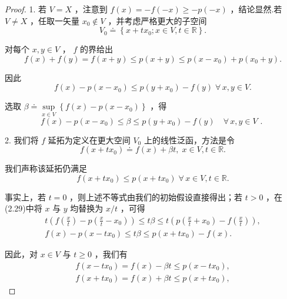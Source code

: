 \begin{proof}
1. 若 $V = X$ ，注意到 $f\left( x\right)  =  - f\left( {-x}\right)  \geq   - p\left( {-x}\right)$ ，结论显然.若 $V \neq  X$ ，任取一矢量 ${x}_{0} \notin  V$ ，并考虑严格更大的子空间
\[
{V}_{0} \doteq  \left\{  {x + t{x}_{0};x \in  V,t \in  \mathbb{R}}\right\}  .
\]

对每个 $x,y \in  V$ ， $f$ 的界给出
\[
f\left( x\right)  + f\left( y\right)  = f\left( {x + y}\right)  \leq  p\left( {x + y}\right)  \leq  p\left( {x - {x}_{0}}\right)  + p\left( {{x}_{0} + y}\right) .
\]

因此
\[
f\left( x\right)  - p\left( {x - {x}_{0}}\right)  \leq  p\left( {y + {x}_{0}}\right)  - f\left( y\right) \;\forall\,x,y \in  V.
\]

选取 $\beta  \doteq  \mathop{\sup }\limits_{{x \in  V}}\left\{  {f\left( x\right)  - p\left( {x - {x}_{0}}\right) }\right\}$ ，得
\begin{equation}\tag{2.29}
f\left( x\right)  - p\left( {x - {x}_{0}}\right)  \leq  \beta  \leq  p\left( {y + {x}_{0}}\right)  - f\left( y\right) \quad \forall\,x,y \in  V\text{ . }
\end{equation}

2. 我们将 $f$ 延拓为定义在更大空间 ${V}_{0}$ 上的线性泛函，方法是令
\[
f\left( {x + t{x}_{0}}\right)  \doteq  f\left( x\right)  + {\beta t},\;x \in  V,t \in  \mathbb{R}.
\]

我们声称该延拓仍满足
\begin{equation}\tag{2.30}
f\left( {x + t{x}_{0}}\right)  \leq  p\left( {x + t{x}_{0}}\right) \;\forall\,x \in  V,t \in  \mathbb{R}.
\end{equation}

事实上，若 $t = 0$ ，则上述不等式由我们的初始假设直接得出；若 $t > 0$ ，在(2.29)中将 $x$ 与 $y$ 均替换为 $x/t$ ，可得
\begin{gather*}
t\left(  {f\left( \frac{x}{t}\right)  - p\left( {\frac{x}{t} - {x}_{0}}\right) }\right)   \leq  {t\beta } \leq  t\left(  {p\left( {\frac{x}{t} + {x}_{0}}\right)  - f\left( \frac{x}{t}\right) }\right) ,\\
f\left( x\right)  - p\left( {x - t{x}_{0}}\right)  \leq  {t\beta } \leq  p\left( {x + t{x}_{0}}\right)  - f\left( x\right) .
\end{gather*}

因此，对 $x \in  V$ 与 $t \geq  0$ ，我们有
\begin{gather*}
f\left( {x - t{x}_{0}}\right)  = f\left( x\right)  - {\beta t} \leq  p\left( {x - t{x}_{0}}\right) , \\
f\left( {x + t{x}_{0}}\right)  = f\left( x\right)  + {\beta t} \leq  p\left( {x + t{x}_{0}}\right) ,
\end{gather*}



\end{proof}
